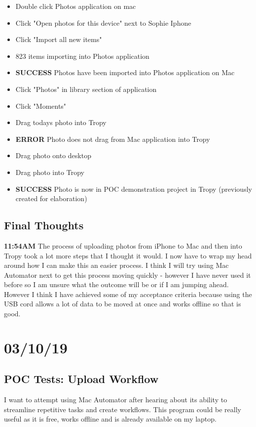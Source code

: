 \documentclass{article}
\begin{document}
\begin{itemize}
\item Double click Photos application on mac
\item Click "Open photos for this device" next to Sophie Iphone
\item Click "Import all new items" 
\item 823 items importing into Photos application
\item \textbf{SUCCESS} Photos have been imported into Photos application on Mac
\item Click "Photos" in library section of application
\item Click "Moments"
\item Drag todays photo into Tropy
\item \textbf{ERROR} Photo does not drag from Mac application into Tropy
\item Drag photo onto desktop
\item Drag photo into Tropy
\item \textbf{SUCCESS} Photo is now in POC demonstration project in Tropy (previously created for elaboration)
\end{itemize}

\subsection{Final Thoughts}
\textbf{11:54AM} The process of uploading photos from iPhone to Mac and then into Tropy took a lot more steps that I thought it would. I now have to wrap my head around how I can make this an easier process. I think I will try using Mac Automator next to get this process moving quickly - however I have never used it before so I am unsure what the outcome will be or if I am jumping ahead. However I think I have achieved some of my acceptance criteria because using the USB cord allows a lot of data to be moved at once and works offline so that is good. 

\section{03/10/19}
\subsection{POC Tests: Upload Workflow}
I want to attempt using Mac Automator after hearing about its ability to streamline repetitive tasks and create workflows. This program could be really useful as it is free, works offline and is already available on my laptop.
\end{document}
